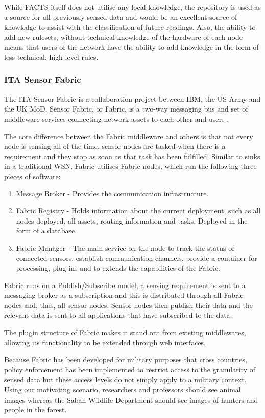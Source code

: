 		While FACTS itself does not utilise any local knowledge, the repository is used as a source for all previously sensed data and would be an excellent source of knowledge to assist with the classification of future readings. Also, the ability to add new rulesets, without technical knowledge of the hardware of each node means that users of the network have the ability to add knowledge in the form of less technical, high-level rules.

	\subsubsection{ITA Sensor Fabric}
	The ITA Sensor Fabric is a collaboration project between IBM, the US Army and the UK MoD. Sensor Fabric, or Fabric, is a two-way messaging bus and set of middleware services connecting network assets to each other and users \cite{Wright2009b}.

The core difference between the Fabric middleware and others is that not every node is sensing all of the time, sensor nodes are tasked when there is a requirement and they stop as soon as that task has been fulfilled. Similar to sinks in a traditional WSN, Fabric utilises Fabric nodes, which run the following three pieces of software:
\begin{enumerate}
	\item Message Broker - Provides the communication infrastructure.
	\item Fabric Registry - Holds information about the current deployment, such as all nodes deployed, all assets, routing information and tasks. Deployed in the form of a database.
	\item Fabric Manager - The main service on the node to track the status of connected sensors, establish communication channels, provide a container for processing, plug-ins and to extends the capabilities of the Fabric.
\end{enumerate}

Fabric runs on a Publish/Subscribe model, a sensing requirement is sent to a messaging broker as a subscription and this is distributed through all Fabric nodes and, thus, all sensor nodes. Sensor nodes then publish their data and the relevant data is sent to all applications that have subscribed to the data. 

The plugin structure of Fabric makes it stand out from existing middlewares, allowing its functionality to be extended through web interfaces.

Because Fabric has been developed for military purposes that cross countries, policy enforcement has been implemented to restrict access to the granularity of sensed data but these access levels do not simply apply to a military context. Using our motivating scenario, researchers and professors should see animal images whereas the Sabah Wildlife Department should see images of hunters and people in the forest.

